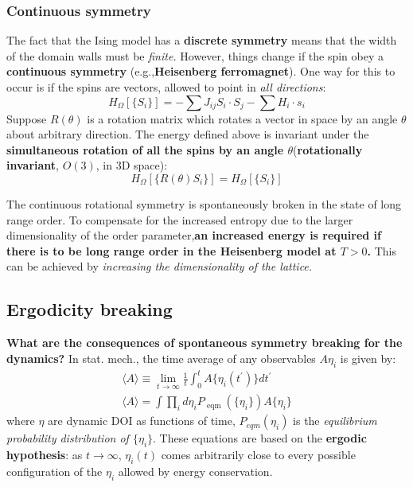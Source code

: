 \documentclass[12pt,titlepage]{article}
\numberwithin{equation}{section}
\begin{document}
\subsubsection{Continuous symmetry}
The fact that the Ising model has a \textbf{discrete symmetry} means that the width of the domain walls must be \textit{finite.} However, things change if the spin obey a \textbf{continuous symmetry} (e.g.,\textbf{Heisenberg ferromagnet}). One way for this to occur is if the spins are vectors, allowed to point in \textit{all directions}:
\begin{equation}
    H _ { \Omega } [ \{ S _ { i } \} ] = - \sum J _ { i j } S _ { i } \cdot S _ { j } - \sum H _ { i } \cdot s _ { i }
\end{equation}
Suppose $R(\theta)$ is a rotation matrix which rotates a vector in space by an angle $\theta$ about arbitrary direction. The energy defined above is invariant under the \textbf{simultaneous rotation of all the spins by an angle $\theta$}(\textbf{rotationally invariant}, $O(3)$, in 3D space):
\begin{equation}
    H _ { \Omega } [ \{ R ( \theta ) S _ { i } \} ] = H _ { \Omega } [ \{ S _ { i } \} ]
\end{equation}

The continuous rotational symmetry is spontaneously broken in the state of long range order. To compensate for the increased entropy due to the larger dimensionality of the order parameter,\textbf{an increased energy is required if there is to be long range order in the Heisenberg model at $T>0$.} This can be achieved by \emph{increasing the dimensionality of the lattice.}

\subsection{Ergodicity breaking}
\textbf{What are the consequences of spontaneous symmetry breaking for the dynamics?} In stat. mech., the time average of any observables $A{\eta_i}$ is given by:
\begin{equation}
    \begin{array} { l } { \langle A \rangle \equiv \lim _ { t \rightarrow \infty } \frac { 1 } { t } \int _ { 0 } ^ { t } A \{ \eta _ { i } ( t ^ { \prime } ) \} d t ^ { \prime } } \\  { \langle A \rangle = \int \prod _ { i } d \eta _ { i } P _ { \text { eqm } } ( \{ \eta _ { i } \} ) A \{ \eta _ { i } \} } \end{array} 
\end{equation}
where $\eta$ are dynamic DOI as functions of time, $P_{eqm}(\eta_i)$ is the \emph{equilibrium probability distribution of $\{\eta_i\}$}. These equations are based on the \textbf{ergodic hypothesis}: as $t\rightarrow\infty$, $\eta_i(t)$ comes arbitrarily close to every possible configuration of the $\eta_i$ allowed by energy conservation.
\end{document}
